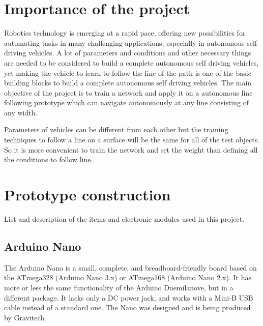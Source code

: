 \documentclass[14pt,a4paper]{extarticle}
\begin{document}
	\section{Importance of the project}
	
	Robotics technology is emerging at a rapid pace, offering new possibilities for automating tasks in many challenging applications, especially in autonomous self driving vehicles. A lot of parameters and conditions and other necessary things are needed to be considered to build a complete autonomous self driving vehicles, yet making the vehicle to learn to follow the line of the path is one of the basic building blocks to build a complete autonomous self driving vehicles. The main objective of the project is to train a network and apply it on a autonomous line following prototype which can navigate autonomously at any line consisting of any width. 
	
	Parameters of vehicles can be different from each other but the training techniques to follow a line on a surface will be the same for all of the test objects. So it is more convenient to train the network and set the weight than defining all the conditions to follow line.
	
	
	\section{Prototype construction}
	
	List and description of the items and electronic modules used in this project. 
	
	\subsection{Arduino Nano}
	
	The Arduino Nano is a small, complete, and breadboard-friendly board based on the ATmega328 (Arduino Nano 3.x) or ATmega168 (Arduino Nano 2.x). It has more or less the same functionality of the Arduino Duemilanove, but in a different package. It lacks only a DC power jack, and works with a Mini-B USB cable instead of a standard one. The Nano was designed and is being produced by Gravitech.
	
\end{document}
